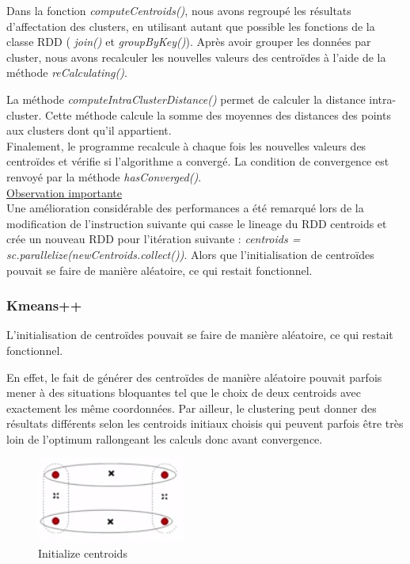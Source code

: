 \documentclass[french]{article}
\begin{document}
Dans la fonction  \textit{computeCentroids()}, nous avons regroupé les résultats d’affectation des clusters, en utilisant autant que possible les fonctions de la classe RDD ( \textit{join()} et  \textit{groupByKey()}). Après avoir grouper les données par cluster, nous avons recalculer les nouvelles valeurs des centroïdes à l’aide de la méthode  \textit{reCalculating()}.

La méthode \textit{computeIntraClusterDistance()} permet de calculer la distance intra-cluster. Cette méthode calcule la somme des moyennes des distances des points aux clusters dont qu'il appartient.\\

Finalement, le programme recalcule à chaque fois les nouvelles valeurs des centroïdes et vérifie si l’algorithme a convergé. La condition de convergence est renvoyé par la méthode  \textit{hasConverged()}.\\

\underline{Observation importante} \\
Une amélioration considérable des performances a été remarqué lors de la modification de l’instruction suivante qui casse le lineage du RDD centroids et crée un nouveau RDD pour l'itération suivante :
\textit{centroids = sc.parallelize(newCentroids.collect())}.
Alors que l’initialisation de centroïdes pouvait se faire de manière aléatoire, ce qui restait fonctionnel. 

\subsubsection{Kmeans++}
L’initialisation de centroïdes pouvait se faire de manière aléatoire, ce qui restait fonctionnel. 

En effet, le fait de générer des centroïdes de manière aléatoire pouvait parfois mener à des situations bloquantes tel que le choix de deux centroids avec exactement les même coordonnées. Par ailleur, le clustering peut donner des résultats différents selon les centroids initiaux choisis qui peuvent parfois être très loin de l’optimum rallongeant les calculs donc avant convergence.

\begin{figure}[h!]
  \centering
  \includegraphics[width=0.4\linewidth]{img/initCentroids.PNG}
  \caption{Initialize centroids}
\end{figure}
\end{document}
